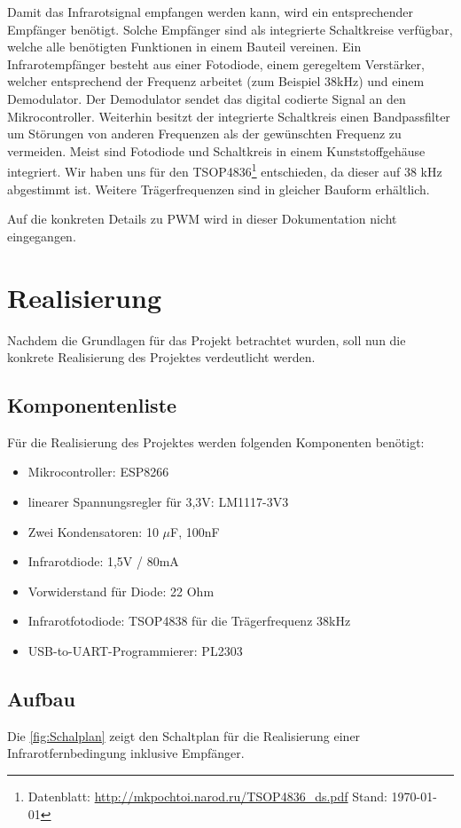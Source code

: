 Damit das Infrarotsignal empfangen werden kann, wird ein entsprechender Empfänger benötigt.
Solche Empfänger sind als integrierte Schaltkreise verfügbar, welche alle benötigten Funktionen in einem Bauteil vereinen.
Ein Infrarotempfänger besteht aus einer Fotodiode, einem geregeltem Verstärker, welcher entsprechend der Frequenz arbeitet (zum Beispiel 38kHz) und einem Demodulator.
Der Demodulator sendet das digital codierte Signal an den Mikrocontroller.
Weiterhin besitzt der integrierte Schaltkreis einen Bandpassfilter um Störungen von anderen Frequenzen als der gewünschten Frequenz zu vermeiden.
Meist sind Fotodiode und Schaltkreis in einem Kunststoffgehäuse integriert.
Wir haben uns für den TSOP4836\footnote{Datenblatt: \url{http://mkpochtoi.narod.ru/TSOP4836_ds.pdf} Stand: \today} entschieden, da dieser auf 38 kHz abgestimmt ist. Weitere Trägerfrequenzen sind in gleicher Bauform erhältlich.

Auf die konkreten Details zu \acs{PWM} wird in dieser Dokumentation nicht eingegangen.

\section{Realisierung}
Nachdem die Grundlagen für das Projekt betrachtet wurden, soll nun die konkrete Realisierung des Projektes verdeutlicht werden.
\subsection{Komponentenliste}
Für die Realisierung des Projektes werden folgenden Komponenten benötigt:
\begin{itemize}
	\item Mikrocontroller: ESP8266
	\item linearer Spannungsregler für 3,3V: LM1117-3V3
	\item Zwei Kondensatoren: 10 $\mu$F, 100nF
	\item Infrarotdiode: 1,5V / 80mA
	\item Vorwiderstand für Diode: 22 Ohm
	\item Infrarotfotodiode: TSOP4838 für die Trägerfrequenz 38kHz
	\item USB-to-UART-Programmierer: PL2303
\end{itemize}


\subsection{Aufbau}
Die \autoref{fig:Schalplan} zeigt den Schaltplan für die Realisierung einer Infrarotfernbedingung inklusive Empfänger.

